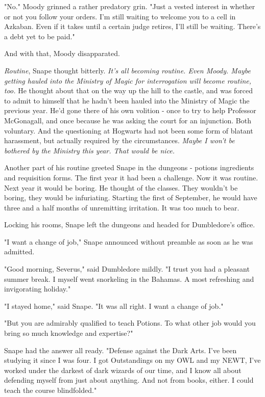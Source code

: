 \documentclass[a4paper,11pt]{article}
\begin{document}
"No." Moody grinned a rather predatory grin. "Just a vested interest in whether or not you follow your orders. I'm still waiting to welcome you to a cell in Azkaban. Even if it takes until a certain judge retires, I'll still be waiting. There's a debt yet to be paid."

And with that, Moody disapparated.

\emph{Routine}, Snape thought bitterly. \emph{It's all becoming routine. Even Moody. Maybe getting hauled into the Ministry of Magic for interrogation will become routine, too.} He thought about that on the way up the hill to the castle, and was forced to admit to himself that he hadn't been hauled into the Ministry of Magic the previous year. He'd gone there of his own volition - once to try to help Professor McGonagall, and once because he was asking the court for an injunction. Both voluntary. And the questioning at Hogwarts had not been some form of blatant harassment, but actually required by the circumstances. \emph{Maybe I won't be bothered by the Ministry this year. That would be nice.}

Another part of his routine greeted Snape in the dungeons - potions ingredients and requisition forms. The first year it had been a challenge. Now it was routine. Next year it would be boring. He thought of the classes. They wouldn't be boring, they would be infuriating. Starting the first of September, he would have three and a half months of unremitting irritation. It was too much to bear.

Locking his rooms, Snape left the dungeons and headed for Dumbledore's office.

"I want a change of job," Snape announced without preamble as soon as he was admitted.

"Good morning, Severus," said Dumbledore mildly. "I trust you had a pleasant summer break. I myself went snorkeling in the Bahamas. A most refreshing and invigorating holiday."

"I stayed home," said Snape. "It was all right. I want a change of job."

"But you are admirably qualified to teach Potions. To what other job would you bring so much knowledge and expertise?"

Snape had the answer all ready. "Defense against the Dark Arts. I've been studying it since I was four. I got Outstandings on my OWL and my NEWT, I've worked under the darkest of dark wizards of our time, and I know all about defending myself from just about anything. And not from books, either. I could teach the course blindfolded."
\end{document}
